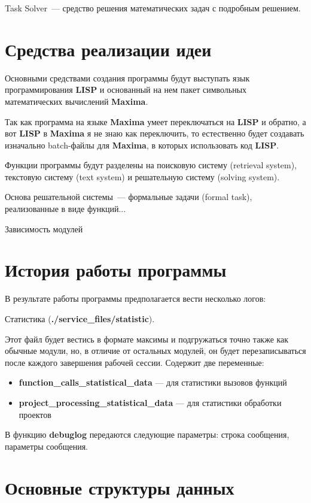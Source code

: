 \documentclass[12pt,a4paper]{article}
\begin{document}
\begin{center}\LARGE
Task Solver~--- средство решения математических задач с подробным решением.
\end{center}

\section{Средства реализации идеи}

Основными средствами создания программы будут выступать язык программирования \textbf{LISP} и основанный на нем пакет символьных математических вычислений \textbf{Maxima}. 

Так как программа на языке \textbf{Maxima} умеет переключаться на \textbf{LISP} и обратно, а вот \textbf{LISP} в \textbf{Maxima} я не знаю как переключить, то естественно будет создавать изначально batch-файлы для \textbf{Maxima}, в которых использовать код \textbf{LISP}.

Функции программы будут разделены на поисковую систему (retrieval system), текстовую систему (text system) и решательную систему (solving system).

Основа решательной системы~--- формальные задачи (formal task), реализованные в виде функций...

Зависимость модулей

\section{История работы программы}

В результате работы программы предполагается вести несколько логов:

Статистика (\textbf{./service\_files/statistic}).

Этот файл будет вестись в формате максимы и подгружаться точно также как обычные модули, но, в отличие от остальных модулей, он будет перезаписываться после каждого завершения рабочей сессии. Содержит две переменные:
\begin{itemize}
\item \textbf{function\_calls\_statistical\_data} --- для статистики вызовов функций
\item \textbf{project\_processing\_statistical\_data} --- для статистики обработки проектов
\end{itemize}


В функцию \textbf{debuglog} передаются следующие параметры: строка сообщения, параметры сообщения.

\section{Основные структуры данных}
\end{document}
